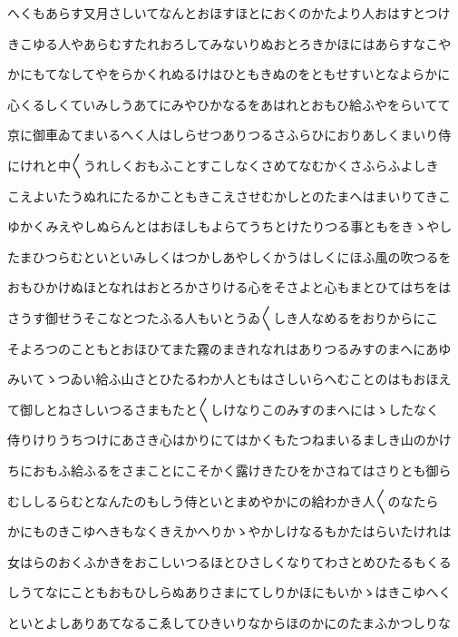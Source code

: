 \documentclass[a4paper,11pt,landscape]{ltjtarticle}
\begin{document}
\par\medskip
へくもあらす又月さしいてなんとおほすほとにおくのかたより人おはすとつけ
\par\medskip
きこゆる人やあらむすたれおろしてみないりぬおとろきかほにはあらすなこや
\par\medskip
かにもてなしてやをらかくれぬるけはひともきぬのをともせすいとなよらかに
\par\medskip
心くるしくていみしうあてにみやひかなるをあはれとおもひ給ふやをらいてて
\par\medskip
京に御車ゐてまいるへく人はしらせつありつるさふらひにおりあしくまいり侍
\par\medskip
にけれと中〱うれしくおもふことすこしなくさめてなむかくさふらふよしき
\par\medskip
こえよいたうぬれにたるかこともきこえさせむかしとのたまへはまいりてきこ
\par\medskip
ゆかくみえやしぬらんとはおほしもよらてうちとけたりつる事ともをきゝやし
\par\medskip
たまひつらむといといみしくはつかしあやしくかうはしくにほふ風の吹つるを
\par\medskip
おもひかけぬほとなれはおとろかさりける心をそさよと心もまとひてはちをは
\par\medskip
さうす御せうそこなとつたふる人もいとうゐ〱しき人なめるをおりからにこ
\par\medskip
そよろつのこともとおほひてまた霧のまきれなれはありつるみすのまへにあゆ
\par\medskip
みいてゝつゐい給ふ山さとひたるわか人ともはさしいらへむことのはもおほえ
\par\medskip
て御しとねさしいつるさまもたと〱しけなりこのみすのまへにはゝしたなく
\par\medskip
侍りけりうちつけにあさき心はかりにてはかくもたつねまいるましき山のかけ
\par\medskip
ちにおもふ給ふるをさまことにこそかく露けきたひをかさねてはさりとも御ら
\par\medskip
むししるらむとなんたのもしう侍といとまめやかにの給わかき人〱のなたら
\par\medskip
かにものきこゆへきもなくきえかへりかゝやかしけなるもかたはらいたけれは
\par\medskip
女はらのおくふかきをおこしいつるほとひさしくなりてわさとめひたるもくる
\par\medskip
しうてなにこともおもひしらぬありさまにてしりかほにもいかゝはきこゆへく
\par\medskip
といとよしありあてなるこゑしてひきいりなからほのかにのたまふかつしりな
\par\medskip
\end{document}
